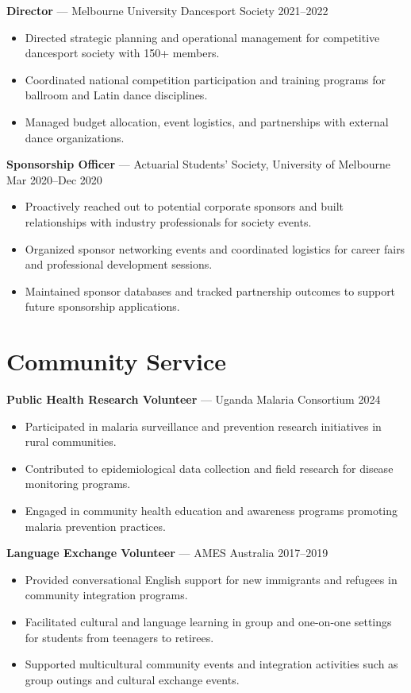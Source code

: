 \documentclass[10pt,letterpaper]{article}
\begin{document}
\textbf{Director} — Melbourne University Dancesport Society \hfill 2021--2022\\[-1.1em]
\begin{itemize}
  \item Directed strategic planning and operational management for competitive dancesport society with 150+ members.
  \item Coordinated national competition participation and training programs for ballroom and Latin dance disciplines.
  \item Managed budget allocation, event logistics, and partnerships with external dance organizations.
\end{itemize}

\textbf{Sponsorship Officer} — Actuarial Students' Society, University of Melbourne \hfill Mar 2020--Dec 2020\\[-1.1em]
\begin{itemize}
  \item Proactively reached out to potential corporate sponsors and built relationships with industry professionals for society events.
  \item Organized sponsor networking events and coordinated logistics for career fairs and professional development sessions.
  \item Maintained sponsor databases and tracked partnership outcomes to support future sponsorship applications.
\end{itemize}

\section*{Community Service}

\textbf{Public Health Research Volunteer} — Uganda Malaria Consortium \hfill 2024\\[-1.1em]
\begin{itemize}
  \item Participated in malaria surveillance and prevention research initiatives in rural communities.
  \item Contributed to epidemiological data collection and field research for disease monitoring programs.
  \item Engaged in community health education and awareness programs promoting malaria prevention practices.
\end{itemize}

\textbf{Language Exchange Volunteer} — AMES Australia \hfill 2017--2019\\[-1.1em]
\begin{itemize}
  \item Provided conversational English support for new immigrants and refugees in community integration programs.
  \item Facilitated cultural and language learning in group and one-on-one settings for students from teenagers to retirees.
  \item Supported multicultural community events and integration activities such as group outings and cultural exchange events.
\end{itemize}
\end{document}
